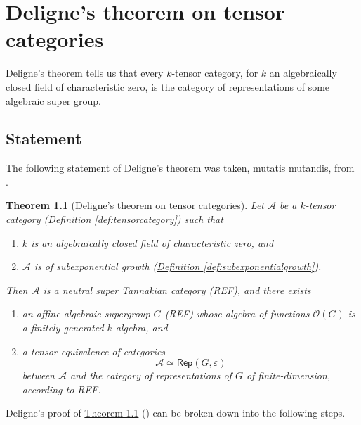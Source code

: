 \documentclass[a4paper,10pt]{scrreprt}
\theoremstyle{definition}
\theoremstyle{plain}
\newtheorem{theorem}{Theorem}[section]
\theoremstyle{remark}
\begin{document}
\chapter{Deligne's theorem on tensor categories}
Deligne's theorem tells us that every $k$-tensor category, for $k$ an algebraically closed field of characteristic zero, is the category of representations of some algebraic super group.

\section{Statement}

The following statement of Deligne's theorem was taken, mutatis mutandis, from \cite{nlab-deligne-theorem}.

\begin{theorem}[Deligne's theorem on tensor categories]
  \label{thm:delignestheorem}
  Let $\mathscr{A}$ be a $k$-tensor category (\hyperref[def:tensorcategory]{Definition \ref*{def:tensorcategory}}) such that
  \begin{enumerate}
    \item $k$ is an algebraically closed field of characteristic zero, and

    \item $\mathscr{A}$ is of subexponential growth (\hyperref[def:subexponentialgrowth]{Definition \ref*{def:subexponentialgrowth}}).
  \end{enumerate}

  Then $\mathscr{A}$ is a neutral super Tannakian category (REF), and there exists 
  \begin{enumerate}
    \item an affine algebraic supergroup $G$ (REF) whose algebra of functions $\mathscr{O}(G)$ is a finitely-generated $k$-algebra, and 

    \item a tensor equivalence of categories
      \begin{equation*}
        \mathscr{A} \simeq \mathsf{Rep}(G, \varepsilon)
      \end{equation*}
      between $\mathscr{A}$ and the category of representations of $G$ of finite-dimension, according to REF.
  \end{enumerate}
\end{theorem}
Deligne's proof of \hyperref[thm:delignestheorem]{Theorem \ref*{thm:delignestheorem}} (\cite{deligne-categories-tensorielle}) can be broken down into the following steps.
\end{document}
